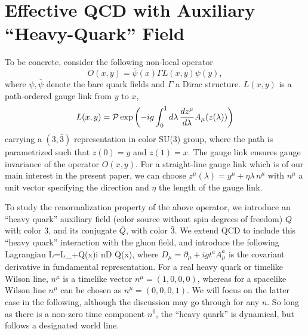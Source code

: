 \section{Effective QCD with Auxiliary ``Heavy-Quark'' Field}

To be concrete, consider the following non-local operator
\begin{equation}\label{Eq:nonlocalop}
 O(x,y) = \overline{\psi}(x) \Gamma L(x,y)\psi(y),
\end{equation}
where $\psi, \bar\psi$ denote the bare quark fields and $\Gamma$ a Dirac structure. $L(x, y)$ is a path-ordered gauge link from $y$ to $x$,
\begin{equation}
             L(x, y) = {\cal P}\exp\left(-ig\int^1_0 d\lambda\,\frac{dz^\mu}{d\lambda}  A_\mu(z(\lambda))\right)
\end{equation}
carrying a $(3,\bar 3)$ representation in color SU(3) group, where the path is parametrized such that $z(0)=y$ and $z(1)=x$. The gauge link ensures gauge invariance of the operator $O(x,y)$.
For a straight-line gauge link which is of our main interest in the present paper, we can choose $z^\mu(\lambda)=y^\mu+\eta\lambda\, n^\mu$ with $n^\mu$ a unit vector specifying the direction and $\eta$ the length of the gauge link.

To study the renormalization property of the above operator, we introduce an ``heavy quark'' auxiliary field (color source without spin degrees of freedom)
$Q$ with color 3,
and its conjugate ${\overline Q}$, with color ${\bar 3}$.
We extend QCD to include this ``heavy quark'' interaction with the gluon field,  and introduce the following Lagrangian
\beq\label{Eq:lag}
{\cal L}={\cal L_{}}+\overline Q(x)i n\cdot D Q(x),
\eeq
where $D_\mu=\partial_\mu+igt^a A^a_\mu$ is the covariant derivative in fundamental representation. For a real heavy quark or timelike Wilson line, $n^\mu$ is a timelike vector $n^\mu=(1,0,0,0)$, whereas for a spacelike Wilson line $n^\mu$ can be chosen as $n^\mu=(0,0,0,1)$. We will focus on the latter case in the following, although the discussion may go through for any $n$.
So long as there is a non-zero time component $n^0$, the ``heavy quark'' is dynamical, but follows a designated world line.

